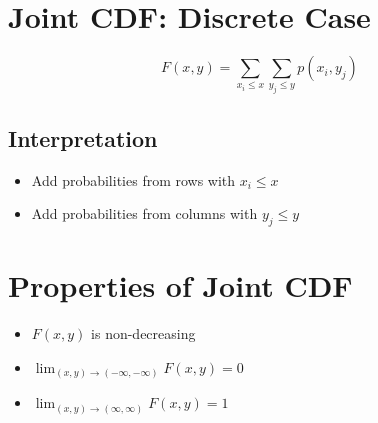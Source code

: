 \documentclass[12pt]{article}
\begin{document}
\section{Joint CDF: Discrete Case}

\[
F(x,y) = \sum_{x_i \leq x} \sum_{y_j \leq y} p(x_i,y_j)
\]

\subsection{Interpretation}
\begin{itemize}
    \item Add probabilities from rows with $x_i \leq x$
    \item Add probabilities from columns with $y_j \leq y$
\end{itemize}

\section{Properties of Joint CDF}

\begin{itemize}
    \item $F(x,y)$ is non-decreasing
    \item $\lim_{(x,y)\to(-\infty,-\infty)} F(x,y) = 0$
    \item $\lim_{(x,y)\to(\infty,\infty)} F(x,y) = 1$
\end{itemize}
\end{document}
